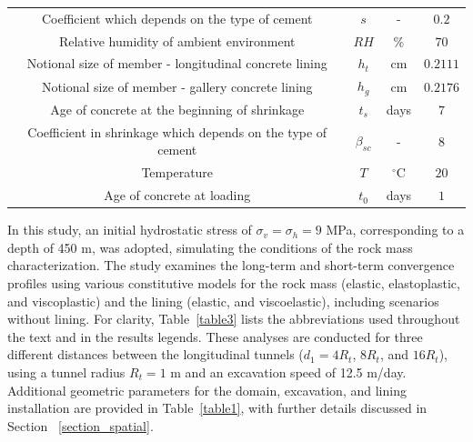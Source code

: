 \documentclass[a4paper,fleqn]{cas-sc}
\begin{document}
\begin{table}[h!]
\begin{tabular}{c c c c}
		Coefficient which depends on the type of cement & $s$ & - & $0.2$ \\
		Relative humidity of ambient environment & $RH$ & \% & $70$ \\
		Notional size of member - longitudinal concrete lining & $h_t$ & cm & $0.2111$ \\
		Notional size of member - gallery concrete lining & $h_{g}$ & cm & $0.2176$ \\
		Age of concrete at the beginning of shrinkage & $t_s$ & days & $7$ \\
		Coefficient in shrinkage which depends on the type of cement & $\beta_{sc}$ & - & $8$ \\
		Temperature & $T$ & $^\circ$C & $20$ \\
		Age of concrete at loading & $t_0$ & days & $1$ \\
		\hline
	\end{tabular}
	\normalsize
\end{table}
\FloatBarrier

In this study, an initial hydrostatic stress of $\sigma_v = \sigma_h = 9$ MPa, corresponding to a depth of 450 m, was adopted, simulating the conditions of the rock mass characterization. The study examines the long-term and short-term convergence profiles using various constitutive models for the rock mass (elastic, elastoplastic, and viscoplastic) and the lining (elastic, and viscoelastic), including scenarios without lining. For clarity, Table~\ref{table3} lists the abbreviations used throughout the text and in the results legends. These analyses are conducted for three different distances between the longitudinal tunnels ($d_1 = 4R_t$, $8R_t$, and $16R_t$), using a tunnel radius $R_t=1$ m and an excavation speed of 12.5 m/day. Additional geometric parameters for the domain, excavation, and lining installation are provided in Table~\ref{table1}, with further details discussed in Section~ \ref{section_spatial}.
\end{document}
